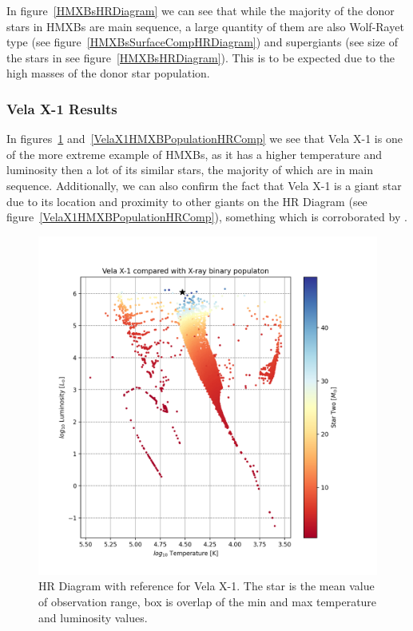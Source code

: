 \documentclass[12pt, a4paper]{article}
\begin{document}
        In figure~\ref{HMXBsHRDiagram} we can see that while the majority of the donor stars in HMXBs are main sequence, a large quantity of them are also Wolf-Rayet type (see figure~\ref{HMXBsSurfaceCompHRDiagram}) and supergiants (see size of the stars in see figure~\ref{HMXBsHRDiagram}). This is to be expected due to the high masses of the donor star population.  

            \subsubsection{Vela X-1 Results} \label{VelaX1Results}

            In figures~\ref{VelaX1XrBPopulationHRComp} and~\ref{VelaX1HMXBPopulationHRComp} we see that Vela X-1 is one of the more extreme example of HMXBs, as it has a higher temperature and luminosity then a lot of its similar stars, the majority of which are in main sequence. Additionally, we can also confirm the fact that Vela X-1 is a giant star due to its location and proximity to other giants on the HR Diagram (see figure~\ref{VelaX1HMXBPopulationHRComp}), something which is corroborated by \parencite{Kretschmar_2021}.

            \begin{figure}[H] 
                \centering
                \includegraphics[width=\textwidth]{figs/GeneratedFigs/VelaX-1/VelaX1XrBPopulationHRComp.png}
                \caption{HR Diagram with reference for Vela X-1. The star is the mean value of observation range, box is overlap of the min and max temperature and luminosity values.}
                \label{VelaX1XrBPopulationHRComp}
            \end{figure}
\end{document}
